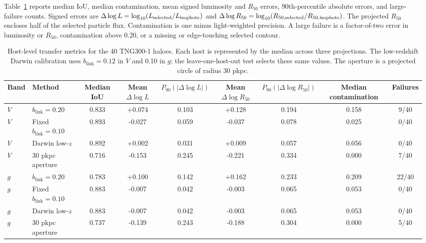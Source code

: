 \documentclass[usenatbib]{mnras}
\begin{document}
Table~\ref{tab:tng300-transfer} reports median IoU, median contamination,
mean signed luminosity and $R_{50}$ errors, 90th-percentile absolute errors,
and large-failure counts. Signed errors are
$\Delta\log L=\log_{10}(L_{\rm selected}/L_{\rm isophote})$ and
$\Delta\log R_{50}=\log_{10}(R_{50,\rm selected}/R_{50,\rm isophote})$.
The projected $R_{50}$ encloses half of the selected particle flux.
Contamination is one minus light-weighted precision. A large failure is a
factor-of-two error in luminosity or $R_{50}$, contamination above 0.20, or
a missing or edge-touching selected contour.

\begin{table}[t]
\centering
\footnotesize
\begingroup
\setlength{\tabcolsep}{2.5pt}
\begin{tabular*}{\textwidth}{@{\extracolsep{\fill}}llccccccc@{}}
\toprule
Band & Method & Median IoU & Mean $\Delta\log L$ &
$P_{90}(|\Delta\log L|)$ & Mean $\Delta\log R_{50}$ &
$P_{90}(|\Delta\log R_{50}|)$ & Median contamination & Failures \\
\midrule
$V$ & $b_{\mathrm{link}}=0.20$ & 0.833 & +0.074 & 0.103 & +0.128 & 0.194 & 0.158 & 9/40 \\
$V$ & Fixed $b_{\mathrm{link}}=0.10$ & 0.893 & -0.027 & 0.059 & -0.037 & 0.078 & 0.025 & 0/40 \\
$V$ & Darwin low-$z$ & 0.892 & +0.002 & 0.031 & +0.009 & 0.057 & 0.056 & 0/40 \\
$V$ & 30 pkpc aperture & 0.716 & -0.153 & 0.245 & -0.221 & 0.334 & 0.000 & 7/40 \\
$g$ & $b_{\mathrm{link}}=0.20$ & 0.783 & +0.100 & 0.142 & +0.162 & 0.233 & 0.209 & 22/40 \\
$g$ & Fixed $b_{\mathrm{link}}=0.10$ & 0.883 & -0.007 & 0.042 & -0.003 & 0.065 & 0.053 & 0/40 \\
$g$ & Darwin low-$z$ & 0.883 & -0.007 & 0.042 & -0.003 & 0.065 & 0.053 & 0/40 \\
$g$ & 30 pkpc aperture & 0.737 & -0.139 & 0.243 & -0.188 & 0.304 & 0.000 & 5/40 \\
\bottomrule
\end{tabular*}
\endgroup
\caption{Host-level transfer metrics for the 40 TNG300-1 haloes. Each host
is represented by the median across three projections. The low-redshift
Darwin calibration uses $b_{\mathrm{link}}=0.12$ in $V$ and 0.10 in $g$;
the leave-one-host-out test selects these same values. The aperture is a
projected circle of radius 30 pkpc.}
\label{tab:tng300-transfer}
\end{table}
\end{document}
